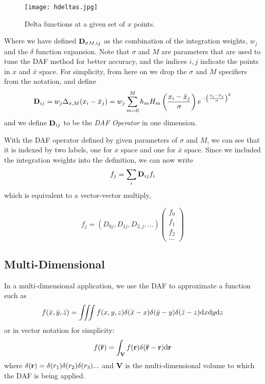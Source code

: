 \documentclass[preprint]{revtex4}
\begin{document}
\begin{figure}
\texttt{[image: hdeltas.jpg]}
\caption{Delta functions at a given set of $x$ points.}
\label{fig:hdeltas}
\end{figure}

Where we have defined ${\bf D}_{\sigma M, ij}$ as the combination of the integration weights, $w_j$ and 
the $\delta$ function expansion. 
Note that $\sigma$ and $M$ are parameters that are used to tune the DAF method for 
better accuracy, and the indices $i,j$ indicate the points in $x$ and $\bar{x}$ space. 
For simplicity, from here on we drop the $\sigma$ and $M$ specifiers from the notation, 
and define
\begin{equation}
\label{eqn_DAF_def0}
{\bf D}_{ij} = w_j \Delta_{\sigma,M}(x_i-\bar{x}_j) = w_j \sum_{m=0}^M h_m H_m \left(\frac{x_i-\bar{x}_j}{\sigma}\right)e^{- \left(\frac{x_i-\bar{x}_j}{\sigma}\right)^2}
\end{equation}
and we define ${\bf D}_{ij}$ to be the {\it DAF Operator} in one dimension. 

With the DAF operator defined by given parameters of $\sigma$ and $M$, we can see that it 
is indexed by two labels, one for $x$ space and one for $\bar{x}$ space. Since we 
included the integration weights into the definition, we can now write
\begin{equation}
f_j = \sum_i {\bf D}_{ij} f_i
\end{equation}
which is equivalent to a vector-vector multiply, 

\begin{equation}
f_j = \left(D_{0j}, D_{1j}, D_{2,j}, ...\right)
\begin{pmatrix}
f_0\\
f_1\\
f_2\\
...
\end{pmatrix}
\end{equation}


\subsection{Multi-Dimensional}

In a multi-dimensional application, we use the DAF to approximate a function such as
\begin{equation}
f(\bar{x},\bar{y},\bar{z}) = \iiint f(x,y,z)\delta(\bar{x}-x)\delta(\bar{y}-y)\delta(\bar{z}-z) {\rm d}x {\rm d}y {\rm d}z
\end{equation}
or in vector notation for simplicity: 
\begin{equation}
f({\bf \bar{r}}) = \int_{\bf V} f({\bf r})\delta({\bf \bar{r}}-{\bf r}){\rm d}{\bf r}
\end{equation}
where $\delta({\bf r}) = \delta(r_1)\delta(r_2)\delta(r_3)...$ and ${\bf V}$ is the
multi-dimensional volume to which the DAF is being applied. 
\end{document}
